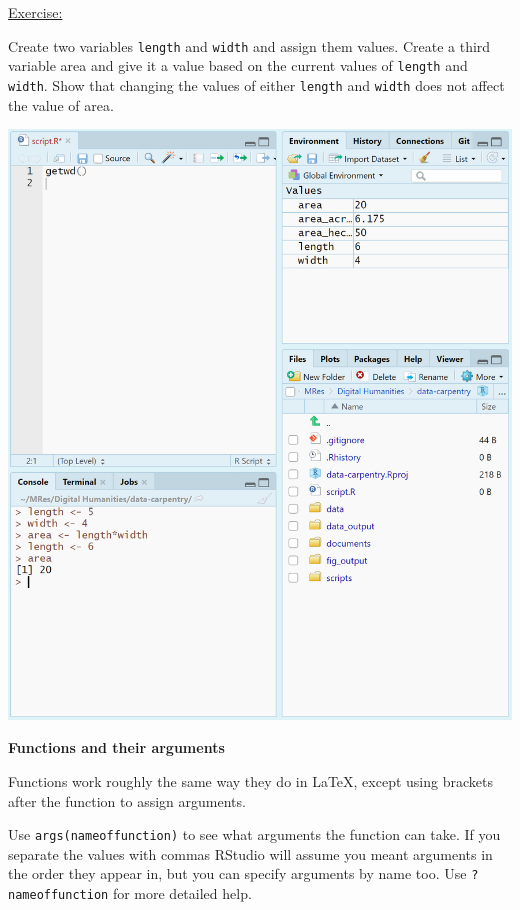 \documentclass[12pt]{article}
\begin{document}
\vspace{0.5em}
\begin{addmargin}[1cm]{0cm}
\color{gray}
\underline{Exercise:}

Create two variables \texttt{length} and \texttt{width} and assign them values. Create a third variable area and give it a value based on the current values of \texttt{length} and \texttt{width}. Show that changing the values of either \texttt{length} and \texttt{width} does not affect the value of area.

\color{black}\vspace{0.5em}

\includegraphics[scale=0.8]{imgrvariables.PNG}
\end{addmargin}

\textbf{Functions and their arguments}

Functions work roughly the same way they do in LaTeX, except using brackets after the function to assign arguments.

Use \texttt{args(nameoffunction)} to see what arguments the function can take. If you separate the values with commas RStudio will assume you meant arguments in the order they appear in, but you can specify arguments by name too. Use \texttt{?nameoffunction} for more detailed help.
\end{document}
